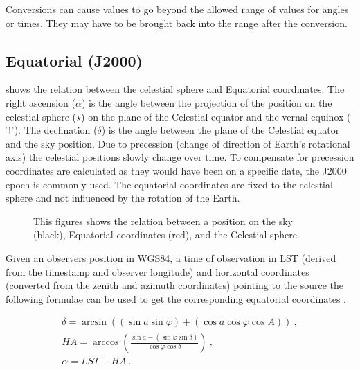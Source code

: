Conversions can cause values to go beyond the allowed range of values
for angles or times. They may have to be brought back into the range
after the conversion.


\subsection{Equatorial (J2000)}

 shows the relation between the celestial sphere
and Equatorial coordinates. The right ascension ($\alpha$) is the angle
between the projection of the position on the celestial sphere ($\star$)
on the plane of the Celestial equator and the vernal equinox
($\vernal$). The declination ($\delta$) is the angle between the plane
of the Celestial equator and the sky position. Due to precession (change
of direction of Earth's rotational axis) the celestial positions slowly
change over time. To compensate for precession coordinates are
calculated as they would have been on a specific date, the J2000 epoch
is commonly used. The equatorial coordinates are fixed to the celestial
sphere and not influenced by the rotation of the Earth.

\begin{figure}
    \centering
    
    \caption{This figures shows the relation between a position on the
             sky (black), Equatorial coordinates (red), and the
             Celestial sphere.}
    \label{fig:equatorial}
\end{figure}

Given an observers position in WGS84, a time of observation in LST
(derived from the \gps timestamp and observer longitude) and horizontal
coordinates (converted from the zenith and azimuth coordinates) pointing
to the source the following formulae can be used to get the
corresponding equatorial coordinates \cite[p. 37]{duffet-smith:1990aa}.

\begin{equation}
    \label{eq:equatorial}
    \begin{array}{l}
        \delta = \arcsin{\left((\sin{a} \sin{\varphi}) +
                               (\cos{a} \cos{\varphi} \cos{A})\right)} \ , \\
        \mathit{HA} = \arccos{\left(\frac{\sin{a} - (\sin{\varphi} \sin{\delta})}
                                         {\cos{\varphi} \cos{\delta}}\right)} \ , \\
        \alpha = \mathit{LST} - \mathit{HA} \ .
    \end{array}
\end{equation}

